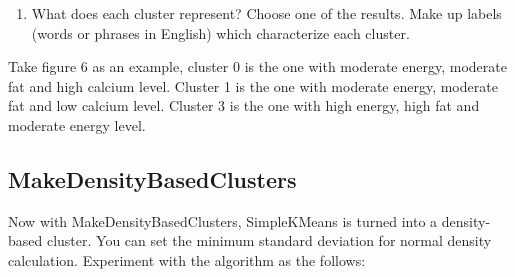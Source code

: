 \documentclass[
]{article}
\providecommand{\tightlist}{%
  \setlength{\itemsep}{0pt}\setlength{\parskip}{0pt}}
\begin{document}
\begin{enumerate}
\def\labelenumi{\arabic{enumi})}
\setcounter{enumi}{4}
\tightlist
\item
  What does each cluster represent? Choose one of the results. Make up
  labels (words or phrases in English) which characterize each cluster.
\end{enumerate}

Take figure 6 as an example, cluster 0 is the one with moderate energy,
moderate fat and high calcium level. Cluster 1 is the one with moderate
energy, moderate fat and low calcium level. Cluster 3 is the one with
high energy, high fat and moderate energy level.

\subsection{MakeDensityBasedClusters}\label{makedensitybasedclusters}

Now with MakeDensityBasedClusters, SimpleKMeans is turned into a
density-based cluster. You can set the minimum standard deviation for
normal density calculation. Experiment with the algorithm as the
follows:
\end{document}
